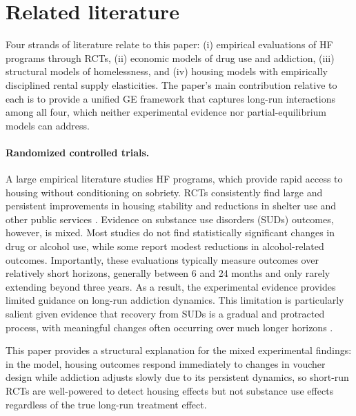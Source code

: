 \documentclass[parskip=full]{article}
\theoremstyle{plain}
\theoremstyle{definition}
\theoremstyle{remark}
\begin{document}
\section{Related literature}\label{sec:literature}

Four strands of literature relate to this paper: (i) empirical evaluations of HF programs through RCTs, (ii) economic models of drug use and addiction, (iii) structural models of homelessness, and (iv) housing models with empirically disciplined rental supply elasticities. The paper's main contribution relative to each is to provide a unified GE framework that captures long-run interactions among all four, which neither experimental evidence nor partial-equilibrium models can address.

\paragraph{Randomized controlled trials.}
A large empirical literature studies HF programs, which provide rapid access to housing without conditioning on sobriety. RCTs consistently find large and persistent improvements in housing stability and reductions in shelter use and other public services \citep{tsemberis2004housing,larimer2009housing,padgett2006housing,goering2014national,aubry2016housing}. Evidence on substance use disorders (SUDs) outcomes, however, is mixed. Most studies do not find statistically significant changes in drug or alcohol use, while some report modest reductions in alcohol-related outcomes. Importantly, these evaluations typically measure outcomes over relatively short horizons, generally between 6 and 24 months and only rarely extending beyond three years. As a result, the experimental evidence provides limited guidance on long-run addiction dynamics. This limitation is particularly salient given evidence that recovery from SUDs is a gradual and protracted process, with meaningful changes often occurring over much longer horizons \citep{vaillant1995natural}. 

This paper provides a structural explanation for the mixed experimental findings: in the model, housing outcomes respond immediately to changes in voucher design while addiction adjusts slowly due to its persistent dynamics, so short-run RCTs are well-powered to detect housing effects but not substance use effects regardless of the true long-run treatment effect.
\end{document}
